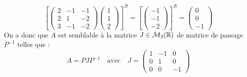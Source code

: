 \begin{example}[Trigonalisation]
            \[ 
                \left[
                    \begin{pmatrix}
                        2 & -1 & -1 \\ 
                        2 & 1 & -2 \\ 
                        3 & -1 & -2 
                    \end{pmatrix}
                    \begin{pmatrix}
                        1 \\ 
                        1 \\ 
                        2 
                    \end{pmatrix}
                \right]^ \mathcal{B} 
                = 
                \left[
                    \begin{pmatrix}
                        -1 \\ 
                        -1 \\ 
                        -2 
                    \end{pmatrix}
                \right]^ \mathcal{B}
                = 
                \begin{pmatrix}
                    0 \\ 
                    0 \\ 
                    -1
                \end{pmatrix}
            \] 
    On a donc que $A$ est semblable à la matrice $J \in \mathcal{M}_3(\mathbb{R})$ de matrice de passage $P^{-1}$ telles que : 
        \[ A = PJP^{-1} \quad \text{avec} \quad J = 
            \begin{pmatrix}
                1 & -1 & 0 \\ 
                0 & 1 & 0 \\ 
                0 & 0 & -1 
            \end{pmatrix}
        \] 
\end{example}